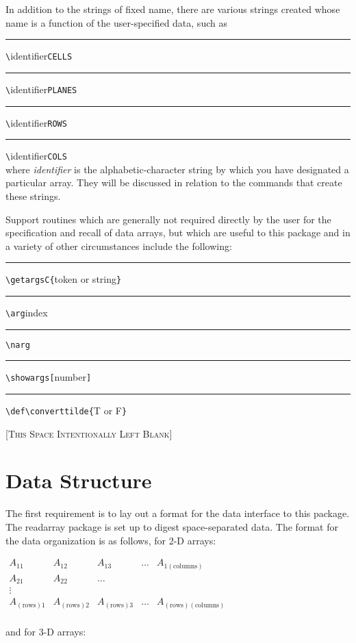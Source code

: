 \documentclass{article}
\newcommand\rl{\rule{1em}{0in}}
\def\rdar{\textsf{readarray}}
\let\vb\verb
\begin{document}
In addition to the strings of fixed name, there are various strings
created whose name is a function of the user-specified data, such
as\\\itshape
\rl\vb|\|identifier\vb|CELLS|\\
\rl\vb|\|identifier\vb|PLANES|\\
\rl\vb|\|identifier\vb|ROWS|\\
\rl\vb|\|identifier\vb|COLS|\\\upshape
where \textit{identifier} is the alphabetic-character string by which
you have designated a particular array.  They will be discussed in
relation to the commands that create these strings.

Support routines which are generally not required directly by
the user for the specification and recall of data arrays, but which are
useful to this package and in a variety of other circumstances include
the following:\\\itshape
\rl\vb|\getargsC{|token {\upshape or} string\vb|}|\\
\rl\vb|\arg|index\\
\rl\vb|\narg|\\
\rl\vb|\showargs[|number\vb|]|\\\upshape
\rl\vb|\def\converttilde{|T or F\vb|}|\upshape

\begin{center}
\vfill
[\textsc{This Space Intentionally Left Blank}]
\vfill
\end{center}
\clearpage
\section{Data Structure}

The first requirement is to lay out a format for the data interface to
this package.  The {\rdar} package is set up to digest space-separated data.
The format for the data organization is as follows, for 2-D arrays:

\(
\begin{array}{lllll}
A_{11} &A_{12} &A_{13} & \ldots & A_{1\mathrm{(columns)}} \\
A_{21} &A_{22} & \ldots && \\
\vdots&&&&\\
A_{\mathrm{(rows)}1} &A_{\mathrm{(rows)}2} &A_{\mathrm{(rows)}3} & 
              \ldots & A_{\mathrm{(rows)}\mathrm{(columns)}} \\
\end{array}
\)

and for 3-D arrays:
\end{document}

